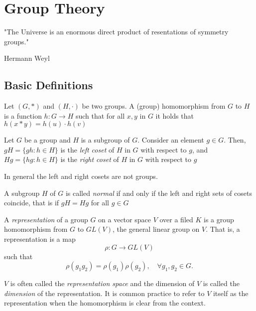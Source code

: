 \chapter{Group Theory}
\adjustmtc
\minitoc
\epigraph{"The Universe is an enormous direct product of resentations of
symmetry groups."}{Hermann Weyl}
\section{Basic Definitions}
\begin{definition}
Let $(G, *)$ and $(H,\cdot)$ be two groups. A (group) homomorphism from $G$ to $H$ is a function $h:G\rightarrow H$ such that for all $x,y$ in $G$ it holds that
$h(x*y) = h(u)\cdot h(v)$
\end{definition}
\begin{definition}[Coset]
Let $G$ be a group and $H$ is a subgroup of $G$. Consider an element $g \in G$. Then, $gH = \{ gh : h\in H\}$ is the \textit{left coset} of $H$ in $G$ with respect to $g$, and $Hg = \{hg : h\in H\}$ is the \textit{right coset} of $H$ in $G$ with respect to $g$
\end{definition}
\begin{remark}
In general the left and right cosets are not groups.
\end{remark}

\begin{definition}
A subgroup $H$ of $G$ is called \textit{normal} if and only if the left and right sets of cosets coincide, that is if $gH = Hg$ for all $g\in G$ 
\end{definition}

\begin{definition}[Representation]
  A \textit{representation} of a group $G$ on a vector space $V$ over a filed
  $K$ is a group homomorphism from $G$ to $GL(V)$, the general linear group on
  $V$. That is, a representation is a map
  \begin{equation}
    \rho:G\rightarrow GL(V)
  \end{equation}
such that
\begin{equation}
  \rho(g_1g_2) = \rho(g_1)\rho(g_2), \quad \forall g_1,g_2 \in G.
\end{equation}
\end{definition}

$V$ is often called the \textit{representation space} and the dimension of $V$
is called the \textit{dimension} of the representation. It is common practice
to refer to $V$ itself as the representation when the homomorphism is clear
from the context.

